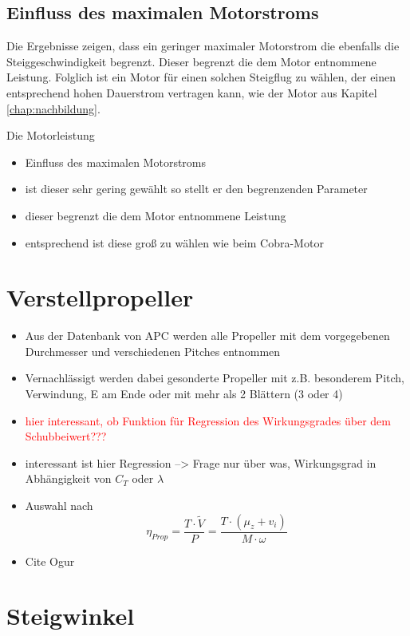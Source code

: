 \subsection{Einfluss des maximalen Motorstroms}
Die Ergebnisse zeigen, dass ein geringer maximaler Motorstrom die ebenfalls die Steiggeschwindigkeit begrenzt. Dieser begrenzt die dem Motor entnommene Leistung. Folglich ist ein Motor für einen solchen Steigflug zu wählen, der einen entsprechend hohen Dauerstrom vertragen kann, wie der Motor aus Kapitel \ref{chap:nachbildung}.

Die Motorleistung
\begin{itemize}
	\item Einfluss des maximalen Motorstroms
	\item ist dieser sehr gering gewählt so stellt er den begrenzenden Parameter
	\item dieser begrenzt die dem Motor entnommene Leistung 
	\item entsprechend ist diese groß zu wählen wie beim Cobra-Motor
\end{itemize}

\section{Verstellpropeller}
\label{sec:verstellprop}

\begin{itemize}
	\item Aus der Datenbank von APC werden alle Propeller mit dem vorgegebenen Durchmesser und verschiedenen Pitches entnommen
	\item Vernachlässigt werden dabei gesonderte Propeller mit z.B. besonderem Pitch, Verwindung, E am Ende oder mit mehr als 2 Blättern (3 oder 4)
	\item \textcolor{red}{hier interessant, ob Funktion für Regression des Wirkungsgrades über dem Schubbeiwert???}
	\item interessant ist hier Regression --> Frage nur über was, Wirkungsgrad in Abhängigkeit von \ensuremath{C_T} oder \ensuremath{\lambda}
	\item Auswahl nach 
	\begin{equation}
		\eta_{Prop} = \frac{T\cdot\tilde{V}}{P} = \frac{T\cdot (\mu_z + v_i)}{M\cdot \omega}
	\end{equation}
	\item Cite Ogur
\end{itemize}

\section{Steigwinkel}
\label{sec:steigwinkel}

